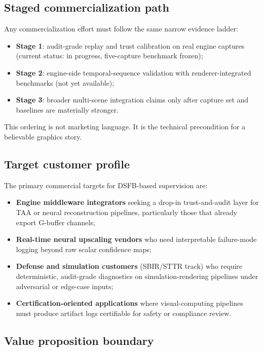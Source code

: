 \documentclass[11pt,letterpaper]{article}
\theoremstyle{gcresult}
\theoremstyle{definition}
\begin{document}
\subsection{Staged commercialization path}

Any commercialization effort must follow the same narrow evidence ladder:
\begin{itemize}[leftmargin=1.5em]
    \item \textbf{Stage 1}: audit-grade replay and trust calibration on real engine captures (current status: in progress, five-capture benchmark frozen);
    \item \textbf{Stage 2}: engine-side temporal-sequence validation with renderer-integrated benchmarks (not yet available);
    \item \textbf{Stage 3}: broader multi-scene integration claims only after capture set and baselines are materially stronger.
\end{itemize}

This ordering is not marketing language. It is the technical precondition for a believable graphics story.

\subsection{Target customer profile}

The primary commercial targets for DSFB-based supervision are:
\begin{itemize}[leftmargin=1.5em]
    \item \textbf{Engine middleware integrators} seeking a drop-in trust-and-audit layer for TAA or neural reconstruction pipelines, particularly those that already export G-buffer channels;
    \item \textbf{Real-time neural upscaling vendors} who need interpretable failure-mode logging beyond raw scalar confidence maps;
    \item \textbf{Defense and simulation customers} (SBIR/STTR track) who require deterministic, audit-grade diagnostics on simulation-rendering pipelines under adversarial or edge-case inputs;
    \item \textbf{Certification-oriented applications} where visual-computing pipelines must produce artifact logs certifiable for safety or compliance review.
\end{itemize}

\subsection{Value proposition boundary}
\end{document}
